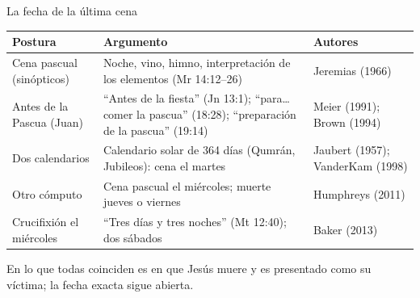 \begin{frame}{La fecha de la última cena}
\scriptsize\renewcommand{\arraystretch}{1.12}
\begin{tabular}{@{}L{3.0cm}L{6.0cm}L{3.0cm}@{}}
\toprule
\textbf{Postura} & \textbf{Argumento} & \textbf{Autores} \\ \midrule
Cena pascual (sinópticos) & Noche, vino, himno, interpretación de los elementos (Mr 14:12--26) & Jeremias (1966) \\
Antes de la Pascua (Juan) & ``Antes de la fiesta'' (Jn 13:1); ``para\ldots{} comer la pascua'' (18:28); ``preparación de la pascua'' (19:14) & Meier (1991); Brown (1994) \\
Dos calendarios & Calendario solar de 364 días (Qumrán, Jubileos): cena el martes & Jaubert (1957); VanderKam (1998) \\
Otro cómputo & Cena pascual el miércoles; muerte jueves o viernes & Humphreys (2011) \\
Crucifixión el miércoles & ``Tres días y tres noches'' (Mt 12:40); dos sábados & Baker (2013) \\
\bottomrule
\end{tabular}\par\medskip
\small\RaggedRight En lo que todas coinciden es en que Jesús muere  y es presentado como su víctima; la fecha exacta sigue abierta.
\end{frame}

